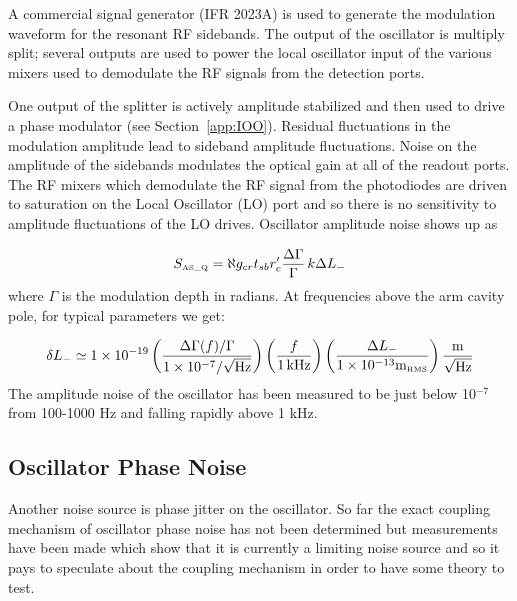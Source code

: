 A commercial signal generator (IFR 2023A) is used to generate the modulation
waveform for the resonant RF sidebands. The output of the oscillator is
multiply split; several outputs are used to power the local oscillator
input of the various mixers used to demodulate the RF signals from the
detection ports.

One output of the splitter is actively amplitude stabilized and then used
to drive a phase modulator (see Section~\ref{app:IOO}).
Residual fluctuations in the modulation amplitude lead to sideband
amplitude fluctuations. Noise on the amplitude of the sidebands
modulates the optical gain at all of the readout ports. The RF mixers 
which demodulate the RF signal from the photodiodes are driven to
saturation on the Local Oscillator (LO) port and so there is no sensitivity 
to amplitude fluctuations of the LO drives. 
Oscillator amplitude noise shows up as \cite{Sigg:FreqResp}

\begin{equation}
S_{\mbox{\tiny AS\_Q}} =
\aleph g_{cr} t_{sb} r_{c}' \frac{\Delta \Gamma}{\Gamma} \, k \Delta L_{-}
\end{equation}
where $\Gamma$ is the modulation depth in radians. At frequencies
above the arm cavity pole, for typical parameters we get:

\begin{equation}
\delta L_- \simeq 1 \times 10^{-19}
           \left(\frac{\Delta \Gamma(f) / \Gamma}{1 \times 10^{-7} /\sqrt{\mbox{Hz}}} \right)
           \left(\frac{f}{1 \, \mbox{kHz}} \right)
           \left(\frac{\Delta L_-}{1 \times 10^{-13} \mbox{m}_{\mbox{\tiny RMS}}} \right)
           \frac{\mbox{m}}{\sqrt{\mbox{Hz}}}
\end{equation}
The amplitude noise of the oscillator has been measured to be just below
10$^{-7}$ from 100-1000 Hz and falling rapidly above 1 kHz.



\subsection{Oscillator Phase Noise}

Another noise source is phase jitter on the oscillator. So far the exact
coupling mechanism of oscillator phase noise has not been determined
but measurements have been made which show that it is currently a limiting
noise source and so it pays to speculate about the coupling mechanism in
order to have some theory to test.

